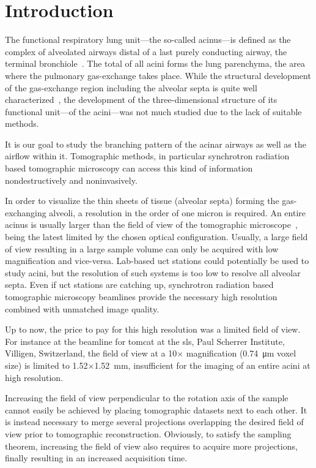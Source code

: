 \section{Introduction}
The functional respiratory lung unit---the so-called acinus---is defined as the complex of alveolated airways distal of a last purely conducting airway, the terminal bronchiole~\cite{Rodriguez1987}. The total of all acini forms the lung parenchyma, the area where the pulmonary gas-exchange takes place. While the structural development of the gas-exchange region including the alveolar septa is quite well characterized~\cite{Schittny2007a,Schittny2008,Mund2008}, the development of the three-dimensional structure of its functional unit---of the acini---was not much studied due to the lack of suitable methods.

It is our goal to study the branching pattern of the acinar airways as well as the airflow within it. Tomographic methods, in particular synchrotron radiation based tomographic microscopy can access this kind of information nondestructively and noninvasively.

In order to visualize the thin sheets of tissue (alveolar septa) forming the gas-exchanging alveoli, a resolution in the order of one micron is required. An entire acinus is usually larger than the field of view of the tomographic microscope~\cite{Rodriguez1987,Weibel2009}, being the latest limited by the chosen optical configuration. Usually, a large field of view resulting in a large sample volume can only be acquired with low magnification and vice-versa. Lab-based \acf{uct} stations could potentially be used to study acini, but the resolution of such systems is too low to resolve all alveolar septa. Even if \ac{uct} stations are catching up, synchrotron radiation based tomographic microscopy beamlines provide the necessary high resolution combined with unmatched image quality.

Up to now, the price to pay for this high resolution was a limited field of view. For instance at the beamline for \acf{tomcat} \cite{Stampanoni2007} at the \acl{sls}, Paul Scherrer Institute, Villigen, Switzerland, the field of view at a 10$\times$ magnification (\SI{0.74}{\micro\meter} voxel size) is limited to 1.52$\times$\SI{1.52}{\milli\meter}, insufficient for the imaging of an entire acini at high resolution.

Increasing the field of view perpendicular to the rotation axis of the sample cannot easily be achieved by placing tomographic datasets next to each other. It is instead necessary to merge several projections overlapping the desired field of view prior to tomographic reconstruction. Obviously, to satisfy the sampling theorem, increasing the field of view also requires to acquire more projections, finally resulting in an increased acquisition time.


